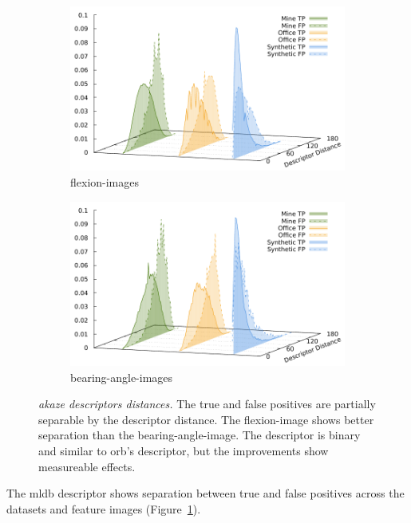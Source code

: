 \begin{figure}[b!]
\begin{subfigure}[t]{0.45\linewidth}
    \includegraphics[width=\linewidth]{chapter06/results/AKAZE/flexion/descriptor_distances.pdf}%
    \caption{\glspl{flexion-image}}
\end{subfigure}\quad
\begin{subfigure}[t]{0.45\linewidth}
    \includegraphics[width=\linewidth]{chapter06/results/AKAZE/bearing/descriptor_distances.pdf}%
    \caption{\glspl{bearing-angle-image}}
\end{subfigure}
\caption[\acrshort{akaze} descriptors distances]{\emph{\acrshort{akaze} descriptors distances.} The true and false positives are partially separable by the descriptor distance. The \gls{flexion-image} shows better separation than the \gls{bearing-angle-image}. The descriptor is binary and similar to \acrshort{orb}'s descriptor, but the improvements show measureable effects.}\label{fig:descriptor_akaze}
\end{figure}
The \acrshort{mldb} descriptor shows separation between true and false positives across the datasets and feature images (Figure~\ref{fig:descriptor_akaze}).
